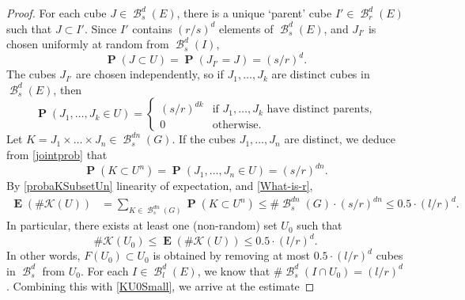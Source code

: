 \documentclass[dvipsnames,letterpaper,12pt]{article}
\numberwithin{equation}{section}
\theoremstyle{plain}
\theoremstyle{remark}
\DeclareMathOperator{\Prob}{\mathbf{P}}
\DeclareMathOperator{\Expect}{\mathbf{E}}
\DeclareMathOperator{\B}{\mathcal{B}}
\begin{document}
\begin{proof}
	For each cube $J \in \B_s^d(E)$, there is a unique `parent' cube $I' \in \B_r^d(E)$ such that $J \subset I'$. Since $I'$ contains $(r/s)^d$ elements of $\B^d_s(E)$, and $J_{I'}$ is chosen uniformly at random from $\B^d_s(I)$,
	\[ \Prob(J \subset U) = \Prob(J_{I'} = J) = (s/r)^d. \]
	The cubes $J_{I'}$ are chosen independently, so if $J_1, \dots, J_k$ are distinct cubes in $\B^d_s(E)$, then %
	\begin{equation}\label{jointprob}
	\Prob(J_1, \dots, J_k \in U) = \begin{cases} (s/r)^{dk} & \text{if $J_1, \dots, J_k$ have distinct parents,} \\ 0 & \text{otherwise}. \end{cases} 
	\end{equation}
	Let $K = J_1 \times \dots \times J_n \in \B^{dn}_s(G)$. If the cubes $J_1, \dots, J_n$ are distinct, we deduce from \eqref{jointprob} that
	\begin{equation}\label{probaKSubsetUn}
		\Prob(K \subset U^n) = \Prob(J_1, \dots, J_n \in U) = (s/r)^{dn}.
	\end{equation}
	By \eqref{probaKSubsetUn} linearity of expectation, and \eqref{What-is-r},
	\begin{align*}
		\Expect(\# \mathcal{K}(U)) &= \sum_{K \in \B^{dn}_s(G)} \Prob(K \subset U^n) \leq \# \B_s^{dn}(G) \cdot (s/r)^{dn}
		\leq 0.5 \cdot (l/r)^d.
	\end{align*}
	In particular, there exists at least one (non-random) set $U_0$ such that
	\begin{equation}\label{KU0Small}
		\# \mathcal{K}(U_0) \leq \Expect(\# \mathcal{K}(U)) \leq 0.5 \cdot (l/r)^d.
	\end{equation}
	 In other words, $F(U_0) \subset U_0$ is obtained by removing at most $0.5 \cdot (l/r)^d$ cubes in $\B^d_s$ from $U_0$. For each $I \in \B_l^d(E)$, we know that $\# \B_{s}^d(I \cap U_0) = (l/r)^d$. Combining this with \eqref{KU0Small}, we arrive at the estimate 

\end{proof}
\end{document}
